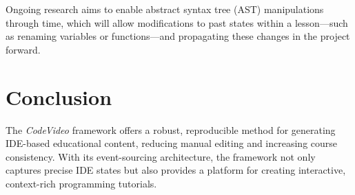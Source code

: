 \documentclass[11pt, a4paper]{article}
\begin{document}
Ongoing research aims to enable abstract syntax tree (AST) manipulations through time, which will allow modifications to past states within a lesson—such as renaming variables or functions—and propagating these changes in the project forward.

\section{Conclusion}

The \textit{CodeVideo} framework offers a robust, reproducible method for generating IDE-based educational content, reducing manual editing and increasing course consistency. With its event-sourcing architecture, the framework not only captures precise IDE states but also provides a platform for creating interactive, context-rich programming tutorials.
\end{document}
